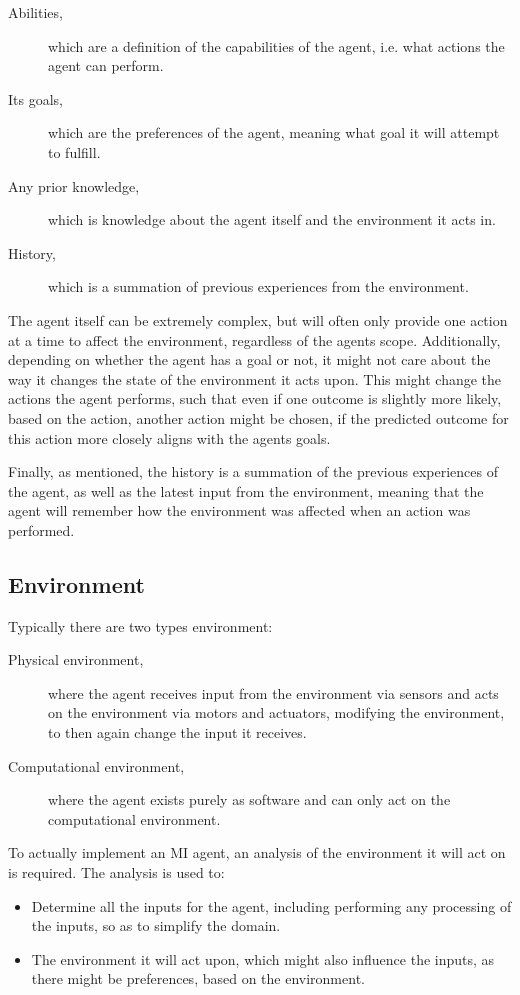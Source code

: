 \begin{description}
    \item[Abilities,]which are a definition of the capabilities of the agent, i{.}e{.} what actions the agent can perform.
    \item[Its goals,]which are the preferences of the agent, meaning what goal it will attempt to fulfill.
    \item[Any prior knowledge,]which is knowledge about the agent itself and the environment it acts in.
    \item[History,]which is a summation of previous experiences from the environment.   
\end{description}
The agent itself can be extremely complex, but will often only provide one action at a time to affect the environment, regardless of the agents scope.
Additionally, depending on whether the agent has a goal or not, it might not care about the way it changes the state of the environment it acts upon.
This might change the actions the agent performs, such that even if one outcome is slightly more likely, based on the action, another action might be chosen, if the predicted outcome for this action more closely aligns with the agents goals.


Finally, as mentioned, the history is a summation of the previous experiences of the agent, as well as the latest input from the environment, meaning that the agent will remember how the environment was affected when an action was performed.

\subsection{Environment}
Typically there are two types environment:
\begin{description}
    \item[Physical environment,]where the agent receives input from the environment via sensors and acts on the environment via motors and actuators, modifying the environment, to then again change the input it receives.
    \item[Computational environment,]where the agent exists purely as software and can only act on the computational environment.
\end{description}
To actually implement an MI agent, an analysis of the environment it will act on is required.
The analysis is used to:
\begin{itemize}
    \item Determine all the inputs for the agent, including performing any processing of the inputs, so as to simplify the domain.
    \item The environment it will act upon, which might also influence the inputs, as there might be preferences, based on the environment.
\end{itemize}

